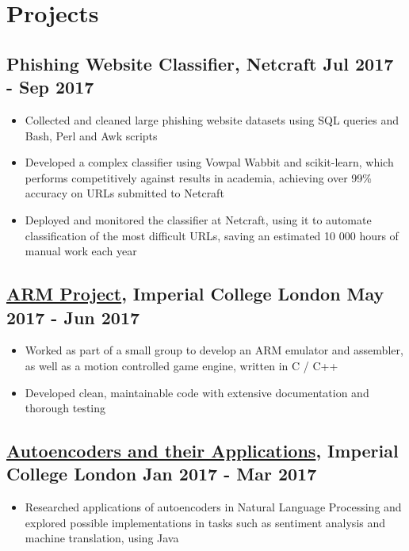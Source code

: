 \documentclass[a4paper, 8pt]{extarticle}
\begin{document}
\begin{minipage}[t]{.66\textwidth}
\section*{Projects}

\subsection*{Phishing Website Classifier, Netcraft \hfill Jul 2017 - Sep 2017}
\begin{itemize}
\item Collected and cleaned large phishing website datasets using SQL queries and Bash, Perl and Awk scripts
\item Developed a complex classifier using Vowpal Wabbit and scikit-learn, which performs competitively against results in academia, achieving over 99\% accuracy on URLs submitted to Netcraft
\item Deployed and monitored the classifier at Netcraft, using it to automate classification of the most difficult URLs, saving an estimated 10 000 hours of manual work each year
\end{itemize}

\subsection*{\href{https://github.com/ic-projects/arm11}{ARM Project}, Imperial College London \hfill May 2017 - Jun 2017}
\begin{itemize}
\item Worked as part of a small group to develop an ARM emulator and assembler, as well as a motion controlled game engine, written in C / C++
\item Developed clean, maintainable code with extensive documentation and thorough testing
\end{itemize}

\subsection*{\href{https://www.doc.ic.ac.uk/~js4416/163/website/}{Autoencoders and their Applications}, Imperial College London \hfill Jan 2017 - Mar 2017}
\begin{itemize}
\item Researched applications of autoencoders in Natural Language Processing and explored possible implementations in tasks such as sentiment analysis and machine translation, using Java
\end{itemize}


\end{minipage}
\end{document}
